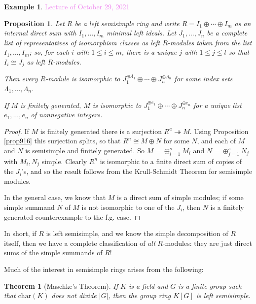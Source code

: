 \documentclass{amsart}[12pt]
\newcommand{\onto}{\twoheadrightarrow}
\newcommand{\Oct}[1]{\textcolor{violet}{Lecture of October #1, 2021}}
\numberwithin{equation}{section}
\theoremstyle{plain} %
\newtheorem{thm}[equation]{Theorem}
\newtheorem{prop}[equation]{Proposition}
\theoremstyle{definition}
\newtheorem{ex}[equation]{Example}
\theoremstyle{remark}
\begin{document}
\begin{ex}
\Oct{29}

      \begin{prop} Let $R$ be a left semisimple ring and write  $R = I_1 \oplus \cdots \oplus I_m$ as an internal direct sum with $I_1, \dots, I_m$ minimal
        left ideals. 
Let $J_1, \dots, J_n$ be a complete list of representatives of isomorphism classes as left $R$-modules
taken from the list $I_1, \dots, I_m$; so, for each $i$ with $1 \leq i \leq m$, there is a unique $j$ with $1 \leq j \leq l$ so
that $I_i \cong J_j$ as left $R$-modules.

        Then every $R$-module is isomorphic to $J_1^{\oplus \Lambda_1} \oplus \cdots \oplus J_n^{\oplus \Lambda_n}$ for some index sets $\Lambda_1,\dots,\Lambda_n$.
        
If $M$ is finitely generated, $M$ is isomorphic to $J_1^{\oplus e_1} \oplus \cdots \oplus J_n^{\oplus e_n}$ for a unique   list $e_1, \dots, e_n$ of nonnegative integers.
      \end{prop}

      \begin{proof}
   If $M$ is finitely generated there is a surjection $R^a \onto M$. Using  Proposition \ref{prop916}
this surjection splits,         so that $R^n \cong M \oplus N$ for some $N$, and each of $M$ and $N$ is semisimple and finitely generated.
So $M = \oplus_{i=1}^s M_i$ and $N = \oplus_{j=1}^s N_j$ with $M_i, N_j$ simple. Clearly $R^n$ is isomorphic to a finite direct sum of copies of the $J_i$'s,
and so the result follows from the Krull-Schmidt Theorem for semisimple modules.

In the general case, we know that $M$ is a direct sum of simple modules; if some simple summand $N$ of $M$ is not isomorphic to one of the $J_i$, then $N$ is a finitely generated counterexample to the f.g. case.
         \end{proof}
      
In short, if $R$ is left semisimple, and we know the simple decomposition of $R$ itself, then we have a complete classification of \emph{all} $R$-modules: they are just direct sums of the simple summands of $R$!
        
Much of the interest in semisimple rings arises from the following:
  

      \begin{thm}[Maschke's Theorem] If $K$ is a field and $G$ is a finite group such that $\mathrm{char}(K)$ does not divide $|G|$, then
        the group ring $K[G]$ is left semisimple.
        \end{thm}


\end{ex}
\end{document}
